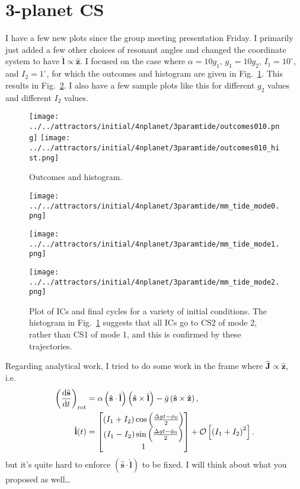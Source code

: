 \documentclass[11pt,
        usenames, %
        dvipsnames %
    ]{article}
\newcommand*{\rd}[2]{\frac{\mathrm{d}#1}{\mathrm{d}#2}}
\newcommand*{\bm}[1]{\boldsymbol{\mathbf{#1}}}
\newcommand*{\uv}[1]{\hat{\bm{#1}}}
\newcommand*{\p}[1]{\left(#1\right)}
\newcommand*{\s}[1]{\left[#1\right]}
\begin{document}
\section{3-planet CS}

I have a few new plots since the group meeting presentation Friday. I primarily
just added a few other choices of resonant angles and changed the coordinate
system to have $\uv{l} \propto \uv{z}$. I focused on the case where $\alpha = 10
g_1$, $g_1 = 10g_2$, $I_1 = 10^\circ$, and $I_2 = 1^\circ$, for which the
outcomes and histogram are given in Fig.~\ref{fig:outcomes}. This results in
Fig.~\ref{fig:mm_tide}. I also have a few sample plots like this for different
$g_2$ values and different $I_2$ values.
\begin{figure}
    \centering
    \texttt{[image: ../../attractors/initial/4nplanet/3paramtide/outcomes010.png]}
    \texttt{[image: ../../attractors/initial/4nplanet/3paramtide/outcomes010\_hist.png]}
    \caption{Outcomes and histogram.}\label{fig:outcomes}
\end{figure}
\begin{figure}
    \centering
    \texttt{[image: ../../attractors/initial/4nplanet/3paramtide/mm\_tide\_mode0.png]}

    \texttt{[image: ../../attractors/initial/4nplanet/3paramtide/mm\_tide\_mode1.png]}

    \texttt{[image: ../../attractors/initial/4nplanet/3paramtide/mm\_tide\_mode2.png]}
    \caption{Plot of ICs and final cycles for a variety of initial
    conditions. The histogram in Fig.~\ref{fig:outcomes} suggests that all ICs
    go to CS2 of mode 2, rather than CS1 of mode 1, and this is confirmed by
    these trajectories.}\label{fig:mm_tide}
\end{figure}

Regarding analytical work, I tried to do some work in the frame where $\uv{J}
\propto \uv{z}$, i.e.\
\begin{align}
    \p{\rd{\uv{s}}{t}}_{\rm rot}
        &= \alpha\p{\uv{s} \cdot \uv{l}}\p{\uv{s} \times \uv{l}}
            - \bar{g}\p{\uv{s} \times \uv{z}}\label{eq:eom_rot},\\
    \uv{l}(t) &= \begin{bmatrix}
        \p{I_1 + I_2}\cos \p{\frac{\Delta gt - \phi_0}{2}}\\
        \p{I_1 - I_2}\sin \p{\frac{\Delta gt - \phi_0}{2}}\\
        1
    \end{bmatrix} + \mathcal{O}\s{\p{I_1 + I_2}^2}.
\end{align}
but it's quite hard to enforce $\p{\uv{s} \cdot \uv{l}}$ to be fixed. I will
think about what you proposed as well\dots
\end{document}
